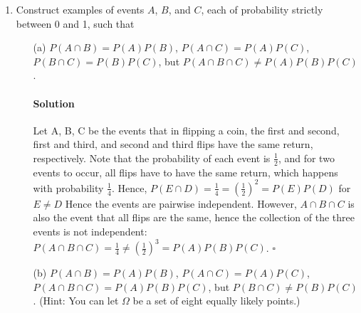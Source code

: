 \documentclass[letterpaper,12pt]{article}
\theoremstyle{definition}
\begin{document}
\begin{enumerate}
    (proof) Define $X = \frac{B}{n}$ as a new random variable. Observer that $E[X] = \frac{np}{n} = p$ and $ Var[X] = Var[\frac{B}{n}] = \frac{Var[B]}{n^2} = \frac{np(1-p)}{n^2} = \frac{p(1-p)}{n}$. Using Chebhyshev's inequality with $X = \frac{B}{n}$ and $\epsilon = $, the statement trivially follows:  
    $$P(\vert X - \mu \vert \ge \epsilon ) \le \frac{\sigma^2}{\epsilon^2} \leftrightarrow P(\vert X - p \vert \ge \epsilon ) \le \frac{p(1-p)}{n\epsilon^2} \quad \square$$
    
    
    
    \paragraph{3.36}  From problem: 
    
    The central limit theorem states that $P(\frac{S_n - n\mu}{\sigma \sqrt[2]{n}} \leq \gamma) \rightarrow \Phi(\gamma)$ where the latter is the standard normal distribution cdf.
    $P(X \le 5500) = \Phi(\frac{5500 - 5000}{\sqrt[]{6242} \cdot \sqrt[]{0.801\cdot 0.199}} ) = \Phi(15.85) \approx 1$, so there is virtually no danger of more than 5500 students. $\square$
    
    
	\item Construct examples of events $A$, $B$, and $C$, each of probability strictly between 0 and 1, such that
   		\begin{itemize}
			\item[(a)] $P(A  \cap B) = P(A)P(B)$, $P(A  \cap C) = P(A)P(C)$, $P(B  \cap C) = P(B)P(C)$, but $P(A  \cap B \cap C) \neq P(A)P(B)P(C)$.
        \paragraph{Solution} Let A, B, C be the events  that in flipping a coin, the first and second, first and third, and second and third flips  have the same return, respectively. Note that the probability of each event is $\frac{1}{2}$, and for two events to occur, all flips have to have the same return, which happens with probability $\frac{1}{4}$. Hence, $P(E \cap D) = \frac{1}{4}= (\frac{1}{2})^2 = P(E) P(D)$ for $E \neq D$ Hence the events are pairwise independent. However, $A \cap B \cap C$ is also the event that all flips are the same, hence the collection of the three events is not independent:  $P(A  \cap B \cap C) = \frac{1}{4} \neq (\frac{1}{2})^3 = P(A)P(B)P(C)$. $\square$
        
        
			\item[(b)] $P(A  \cap B) = P(A)P(B)$, $P(A  \cap C) = P(A)P(C)$, $P(A  \cap B \cap C) = P(A)P(B)P(C)$, but $P(B  \cap C) \neq P(B)P(C)$. (Hint: You can let $\Omega$ be a set of eight equally likely points.)

\end{itemize}
\end{enumerate}
\end{document}
